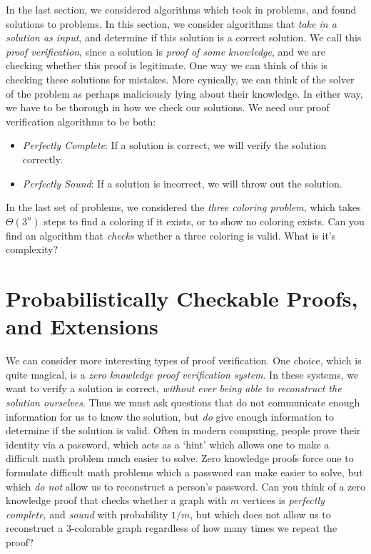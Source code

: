 \documentclass{article}
\theoremstyle{plain}
\theoremstyle{remark}
\theoremstyle{definition}
\begin{document}
In the last section, we considered algorithms which took in problems, and found solutions to problems. In this section, we consider algorithms that \emph{take in a solution as input}, and determine if this solution is a correct solution. We call this \emph{proof verification}, since a solution is \emph{proof of some knowledge}, and we are checking whether this proof is legitimate. One way we can think of this is checking these solutions for mistakes. More cynically, we can think of the solver of the problem as perhaps maliciously lying about their knowledge. In either way, we have to be thorough in how we check our solutions. We need our proof verification algorithms to be both:
%
\begin{itemize}
    \item \emph{Perfectly Complete}: If a solution is correct, we will verify the solution correctly.

    \item \emph{Perfectly Sound}: If a solution is incorrect, we will throw out the solution.
\end{itemize}
%
In the last set of problems, we considered the \emph{three coloring problem}, which takes $\Theta(3^n)$ steps to find a coloring if it exists, or to show no coloring exists. Can you find an algorithm that \emph{checks} whether a three coloring is valid. What is it's complexity?

\section{Probabilistically Checkable Proofs, and Extensions}

We can consider more interesting types of proof verification. One choice, which is quite magical, is a \emph{zero knowledge proof verification system}. In these systems, we want to verify a solution is correct, \emph{without ever being able to reconstruct the solution ourselves}. Thus we must ask questions that do not communicate enough information for us to know the solution, but \emph{do} give enough information to determine if the solution is valid. Often in modern computing, people prove their identity via a password, which acts as a `hint' which allows one to make a difficult math problem much easier to solve. Zero knowledge proofs force one to formulate difficult math problems which a password can make easier to solve, but which \emph{do not} allow us to reconstruct a person's password. Can you think of a zero knowledge proof that checks whether a graph with $m$ vertices is \emph{perfectly complete}, and \emph{sound} with probability $1/m$, but which does not allow us to reconstruct a $3$-colorable graph regardless of how many times we repeat the proof?
\end{document}
